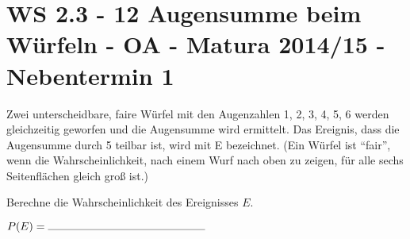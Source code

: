 \section{WS 2.3 - 12 Augensumme beim Würfeln - OA - Matura 2014/15 - Nebentermin 1}

\begin{beispiel}[WS 2.3]{1}
Zwei unterscheidbare, faire Würfel mit den Augenzahlen 1, 2, 3, 4, 5, 6 werden gleichzeitig geworfen und die Augensumme wird ermittelt. Das Ereignis, dass die Augensumme durch 5 teilbar
ist, wird mit E bezeichnet. (Ein Würfel ist "`fair"', wenn die Wahrscheinlichkeit, nach einem Wurf nach oben zu zeigen, für alle sechs Seitenflächen gleich groß ist.) \leer

Berechne die Wahrscheinlichkeit des Ereignisses $E$. \leer

$P(E)= \rule{5cm}{0.3pt}$

\end{beispiel}